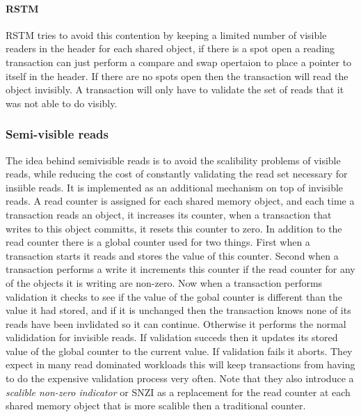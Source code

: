 \paragraph{RSTM}
RSTM \cite{Marathe06loweringthe} tries to avoid this contention by keeping a limited number of visible readers in the header for each shared object, if there is a spot open a reading transaction can just perform a compare and swap opertaion to place a pointer to itself in the header.
If there are no spots open then the transaction will read the object invisibly.
A transaction will only have to validate the set of reads that it was not able to do visibly.

\subsubsection{Semi-visible reads}
The idea behind semivisible reads \cite{lev:anatomy:transact:2009} is to avoid the scalibility problems of visible reads, while reducing the cost of constantly validating the read set necessary for insiible reads.
It is implemented as an additional mechanism on top of invisible reads.
A read counter is assigned for each shared memory object, and each time a transaction reads an object, it increases its counter, when a transaction that writes to this object committs, it resets this counter to zero.
In addition to the read counter there is a global counter used for two things. 
First when a transaction starts it reads and stores the value of this counter.
Second when a transaction performs a write it increments this counter if the read counter for any of the objects it is writing are non-zero.
Now when a transaction performs validation it checks to see if the value of the gobal counter is different than the value it had stored, and if it is unchanged then the transaction knows none of its reads have been invlidated so it can continue.
Otherwise it performs the normal valididation for invisible reads.
If validation succeds then it updates its stored value of the global counter to the current value.
If validation fails it aborts.
They expect in many read dominated workloads this will keep transactions from having to do the expensive validation process very often.
Note that they also introduce a \emph{scalible non-zero indicator} or SNZI as a replacement for the read counter at each shared memory object that is more scalible then a traditional counter.

